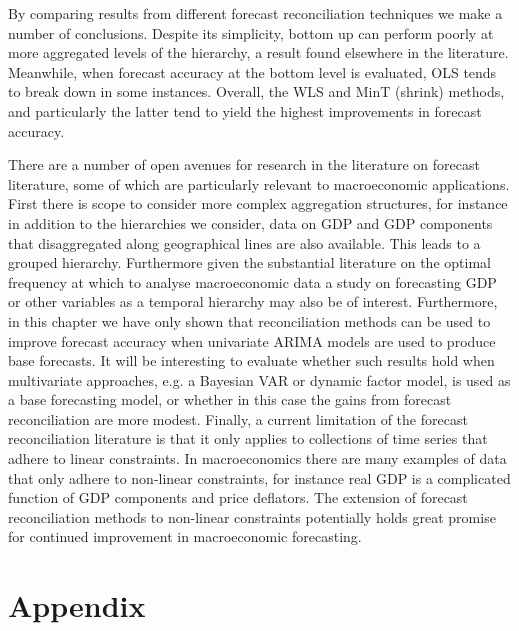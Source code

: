 \documentclass[graybox]{svmult}
\begin{document}
By comparing results from different forecast reconciliation techniques we make a number of conclusions.  Despite its simplicity, bottom up can perform poorly at more aggregated levels of the hierarchy, a result found elsewhere in the literature. Meanwhile, when forecast accuracy at the bottom level is evaluated, OLS tends to break down in some instances.  Overall, the WLS and MinT (shrink) methods, and particularly the latter tend to yield the highest improvements in forecast accuracy.  

There are a number of open avenues for research in the literature on forecast literature, some of which are particularly relevant to macroeconomic applications.  First there is scope to consider more complex aggregation structures, for instance in addition to the hierarchies we consider, data on GDP and GDP components that disaggregated along geographical lines are also available.  This leads to a grouped hierarchy.  Furthermore given the substantial literature on the optimal frequency at which to analyse macroeconomic data a study on forecasting GDP or other variables as a temporal hierarchy may also be of interest.  Furthermore, in this chapter we have only shown that reconciliation methods can be used to improve forecast accuracy when univariate ARIMA models are used to produce base forecasts.  It will be interesting to evaluate whether such results hold when multivariate approaches, e.g. a Bayesian VAR or dynamic factor model, is used as a base forecasting model, or whether in this case the gains from forecast reconciliation are more modest.  Finally, a current limitation of the forecast reconciliation literature is that it only applies to collections of time series that adhere to linear constraints.  In macroeconomics there are many examples of data that only adhere to non-linear constraints, for instance real GDP is a complicated function of GDP components and price deflators.  The extension of forecast reconciliation methods to non-linear constraints potentially holds great promise for continued improvement in macroeconomic forecasting.

\clearpage
\section*{Appendix}
\end{document}
